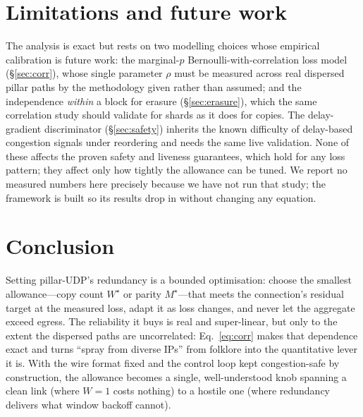 \documentclass[10pt,twocolumn]{article}
\newcommand{\Wstar}{W^{\star}}
\begin{document}
\section{Limitations and future work}
The analysis is exact but rests on two modelling choices whose empirical
calibration is future work: the marginal-$p$ Bernoulli-with-correlation loss
model (\S\ref{sec:corr}), whose single parameter $\rho$ must be measured across
real dispersed pillar paths by the methodology given rather than assumed; and the
independence \emph{within} a block for erasure (\S\ref{sec:erasure}), which the
same correlation study should validate for shards as it does for copies. The
delay-gradient discriminator (\S\ref{sec:safety}) inherits the known difficulty
of delay-based congestion signals under reordering and needs the same live
validation. None of these affects the proven safety and liveness guarantees,
which hold for any loss pattern; they affect only how tightly the allowance can
be tuned. We report no measured numbers here precisely because we have not run
that study; the framework is built so its results drop in without changing any
equation.

\section{Conclusion}
Setting pillar-UDP's redundancy is a bounded optimisation: choose the smallest
allowance---copy count $\Wstar$ or parity $M^\star$---that meets the connection's
residual target at the measured loss, adapt it as loss changes, and never let the
aggregate exceed egress. The reliability it buys is real and super-linear, but
only to the extent the dispersed paths are uncorrelated: Eq.~\eqref{eq:corr}
makes that dependence exact and turns ``spray from diverse IPs'' from folklore
into the quantitative lever it is. With the wire format fixed and the control
loop kept congestion-safe by construction, the allowance becomes a single,
well-understood knob spanning a clean link (where $W{=}1$ costs nothing) to a
hostile one (where redundancy delivers what window backoff cannot).
\end{document}
